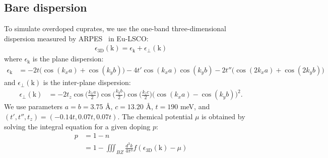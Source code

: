 \documentclass[notitlepage,11pt,nofootinbib]{revtex4-1}
\renewcommand{\vec}[1]{\bm{\mathrm{#1}}}
\begin{document}
\subsection{Bare dispersion}\label{section_doping}
To simulate overdoped cuprates, we use the one-band three-dimensional dispersion measured by ARPES~\cite{horio_three-dimensional_2018} in Eu-LSCO:
\begin{align}
\epsilon_{\text{3D}}(\vec k)=\epsilon_{\vec k}+\epsilon_{\perp}(\vec k)
\end{align}
where $\epsilon_{\vec k}$ is the plane dispersion:
\begin{align}
\epsilon_{\vec k} 
&= 
-2t\big(\cos (k_xa) + \cos (k_yb)\big)
-4t'\cos (k_xa)\cos (k_yb)
-2t''\big(\cos (2k_xa)+\cos (2k_yb)\big)
\end{align}
and $\epsilon_{\perp}(\vec k)$ is the inter-plane dispersion:
\begin{align}
\epsilon_{\perp}(\vec k)
&=
-2t_z\cos\Big(\frac{k_xa}{2}\Big)
\cos\Big(\frac{k_yb}{2}\Big)
\cos\Big(\frac{k_zc}{2}\Big)
\big(\cos (k_xa) - \cos (k_yb)\big)^2.
\end{align}
We use parameters $a=b=3.75$ {\AA}, $c=13.20$ {\AA}, $t=190$ meV, and $(t',t'',t_z)=(-0.14t,0.07t,0.07t)$. The chemical potential $\mu$ is obtained by solving the integral equation for a given doping $p$:
\begin{align}
p &= 1 - n \\
&= 1 - \iiint_{BZ} \frac{d^{3}k}{4\pi^{3}} f(\epsilon_{\text{3D}}(\vec k)-\mu)
\end{align}
\end{document}
